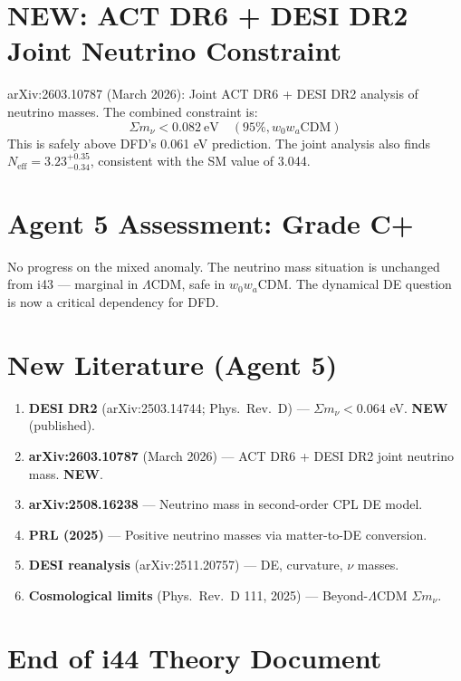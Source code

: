 \documentclass[11pt,a4paper]{article}
\newcommand{\NEW}{\textcolor{dfdblue}{\textbf{NEW}}}
\begin{document}
\section{\NEW: ACT DR6 + DESI DR2 Joint Neutrino Constraint}

arXiv:2603.10787 (March 2026): Joint ACT DR6 + DESI DR2 analysis of neutrino masses. The combined constraint is:
\begin{equation}
\Sigma m_\nu < 0.082~\text{eV} \quad (95\%, w_0 w_a\text{CDM})
\end{equation}
This is safely above DFD's 0.061 eV prediction. The joint analysis also finds $N_{\text{eff}} = 3.23^{+0.35}_{-0.34}$, consistent with the SM value of 3.044.

\section{Agent 5 Assessment: Grade C+}

No progress on the mixed anomaly. The neutrino mass situation is unchanged from i43 --- marginal in $\Lambda$CDM, safe in $w_0 w_a$CDM. The dynamical DE question is now a critical dependency for DFD.

\section{New Literature (Agent 5)}

\begin{enumerate}
\item \textbf{DESI DR2} (arXiv:2503.14744; Phys.\ Rev.\ D) --- $\Sigma m_\nu < 0.064$ eV. \NEW{} (published).
\item \textbf{arXiv:2603.10787} (March 2026) --- ACT DR6 + DESI DR2 joint neutrino mass. \NEW.
\item \textbf{arXiv:2508.16238} --- Neutrino mass in second-order CPL DE model.
\item \textbf{PRL (2025)} --- Positive neutrino masses via matter-to-DE conversion.
\item \textbf{DESI reanalysis} (arXiv:2511.20757) --- DE, curvature, $\nu$ masses.
\item \textbf{Cosmological limits} (Phys.\ Rev.\ D 111, 2025) --- Beyond-$\Lambda$CDM $\Sigma m_\nu$.
\end{enumerate}


\section*{End of i44 Theory Document}
\end{document}
